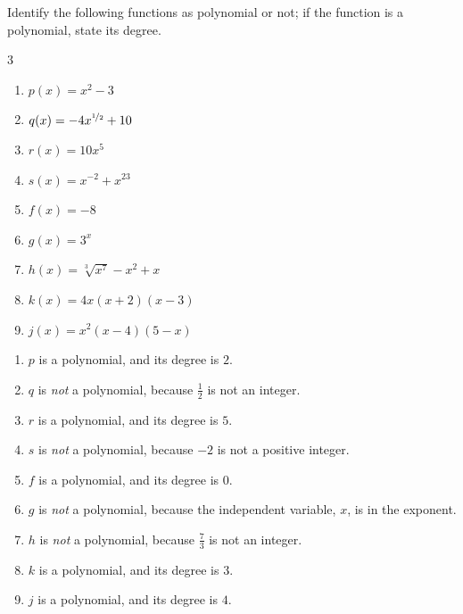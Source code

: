 	 \begin{pccexample}
		 Identify the following functions as polynomial or not; if the function
		 is a polynomial, state its degree.
		 \begin{multicols}{3}
			 \begin{enumerate}
				 \item $p(x)=x^2-3$
				 \item $q(x)=-4x^{\nicefrac{1}{2}}+10$
				 \item $r(x)=10x^5$
				 \item $s(x)=x^{-2}+x^{23}$
				 \item $f(x)=-8$
				 \item $g(x)=3^x$
				 \item $h(x)=\sqrt[3]{x^7}-x^2+x$
				 \item $k(x)=4x(x+2)(x-3)$
				 \item $j(x)=x^2(x-4)(5-x)$
			 \end{enumerate}
		 \end{multicols}
		 \begin{pccsolution}
			 \begin{enumerate}
				 \item $p$ is a polynomial, and its degree is $2$.
				 \item $q$ is \emph{not} a polynomial, because $\frac{1}{2}$ is not an integer.
				 \item $r$ is a polynomial, and its degree is $5$.
				 \item $s$ is \emph{not} a polynomial, because $-2$ is not a positive integer.
				 \item $f$ is a polynomial, and its degree is $0$.
				 \item $g$ is \emph{not} a polynomial, because the independent
				       variable, $x$, is in the exponent.
				 \item $h$ is \emph{not} a polynomial, because $\frac{7}{3}$ is not an integer.
				 \item $k$ is a polynomial, and its degree is $3$.
				 \item $j$ is a polynomial, and its degree is $4$.
			 \end{enumerate}
		 \end{pccsolution}
	 \end{pccexample}

